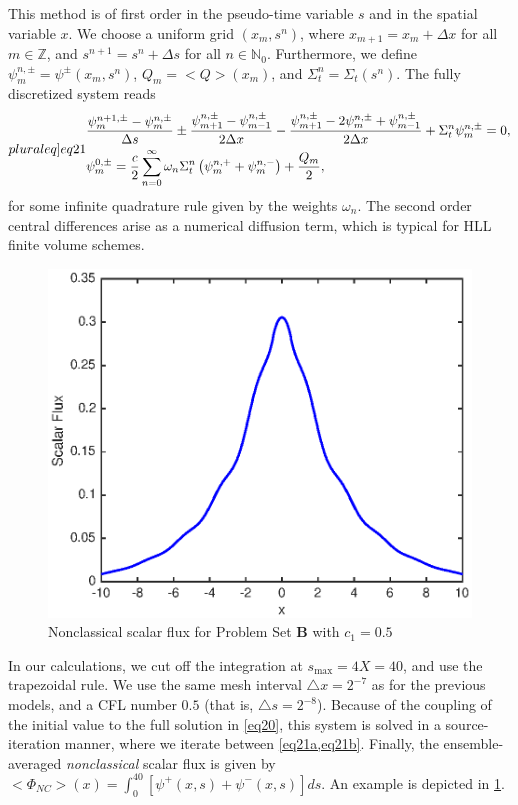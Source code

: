 \documentclass[12pt]{article}
\newcommand{\bl}{\big<}
\newcommand{\bg}{\big>}
\begin{document}
This method is of first order in the pseudo-time variable $s$ and in the spatial variable $x$.
We choose a uniform grid $(x_m,s^n)$, where $x_{m+1} = x_{m} + \Delta x$ for all $m\in\mathbb{Z}$, and $s^{n+1} = s^n + \Delta s$ for all $n\in\mathbb{N}_0$.
Furthermore, we define $\psi_{m}^{n,\pm}= \psi^\pm(x_{m},s^n)$, $Q_m = \bl Q\bg (x_m)$, and $\Sigma_t^n=\Sigma_t(s^n)$.
The fully discretized system reads
\begin{subequations}\label[pluraleq]{eq21}
\begin{align}
	& \frac{\psi^{n+1,\pm}_m-\psi^{n,\pm}_m}{\Delta s} \pm \frac{\psi^{n,\pm}_{m+1}-\psi_{m-1}^{n,\pm}}{2\Delta x} - 
			\frac{\psi^{n,\pm}_{m+1}-2\psi_m^{n,\pm}+\psi_{m-1}^{n,\pm}}{2\Delta x}   + \Sigma_t^n \psi^{n,\pm}_m = 0, \label{eq21a}\\
	&  \psi_m^{0,\pm} = \frac{c}{2}\sum\limits_{n=0}^\infty \omega_n \Sigma_t^n\left( \psi_m^{n,+} + \psi^{n,-}_m\right)  +  \frac{Q_m}{2},\label{eq21b}	
\end{align}
\end{subequations}
for some infinite quadrature rule given by the weights $\omega_n$.
The second order central differences arise as a numerical diffusion term, which is typical for HLL finite volume schemes.
\begin{figure}[htb]
  \centering
  \includegraphics[scale=1]{fig7.eps}
  \caption{Nonclassical scalar flux for Problem Set {\bf B} with $c_1=0.5$}
  \label{fig7}
\end{figure}

In our calculations, we cut off the integration at $s_{\text{max}}=4X=40$, and use the trapezoidal rule.
We use the same mesh interval $\triangle x=2^{-7}$ as for the previous models, and a CFL number $0.5$ (that is, $\triangle s = 2^{-8}$). 
Because of the coupling of the initial value to the full solution in \cref{eq20}, this system is solved in a source-iteration manner, where we iterate between \cref{eq21a,eq21b}.
Finally, the ensemble-averaged {\em nonclassical} scalar flux is given by $\bl\Phi_{NC}\bg(x) = \int_0^{40}[\psi^+(x,s)+\psi^-(x,s)]ds$. An example is depicted in \cref{fig7}.
\end{document}
